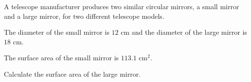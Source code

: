 \begin{question}
\noindent A telescope manufacturer produces two similar circular mirrors, a small mirror and a large mirror, for two different telescope models.

\noindent The diameter of the small mirror is $12$ cm and the diameter of the large mirror is $18$ cm.

\noindent The surface area of the small mirror is $113.1$ cm$^2$.

\noindent Calculate the surface area of the large mirror.

\vspace{5cm}

\begin{flushright}
\end{flushright}
\end{question}
